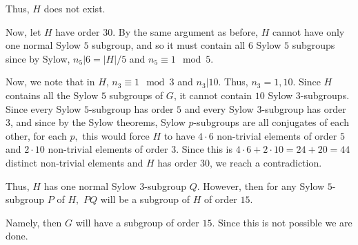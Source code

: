 \documentclass[12pt]{AlgebraQual}
\begin{document}
\begin{solution}
\begin{enumerate}[label=(\alph*)]
    Thus, $H$ does not exist.

     Now, let $H$ have order $30.$ By the same argument as before, $H$ cannot have only one normal Sylow $5$ subgroup, and so it must contain all $6$ Sylow $5$ subgroups since by Sylow, $n_5|6=|H|/5$ and $n_5\equiv 1\mod 5.$

    Now, we note that in $H$, $n_3\equiv 1\mod 3$ and $n_3|10$. Thus, $n_3=1,10.$ Since $H$ contains all the Sylow $5$ subgroups of $G$, it cannot contain $10$ Sylow $3$-subgroups. Since every Sylow $5$-subgroup has order $5$ and every Sylow $3$-subgroup has order $3$, and since by the Sylow theorems, Sylow $p$-subgroups are all conjugates of each other, for each $p,$ this would force $H$ to have $4\cdot 6$ non-trivial elements of order $5$ and $2\cdot 10$ non-trivial elements of order $3$. Since this is $4\cdot 6+2\cdot 10=24+20=44$ distinct non-trivial elements and $H$ has order $30$, we reach a contradiction.

    Thus, $H$ has one normal Sylow $3$-subgroup $Q$. However, then for any Sylow $5$-subgroup $P$ of $H,$ $PQ$ will be a subgroup of $H$ of order $15$.

    Namely, then $G$ will have a subgroup of order $15.$ Since this is not possible we are done.

\begin{comment}
    Therefore, $$|H\cap N_G(P)|=|N_H(P)|=|H|/n_5=30/6=5$$ and so $$|HN_G(P)|=\frac{|H||N_G(P)|}{|H\cap N_G(P)|}=\frac{30\cdot 20}{5}=120.$$

    Namely, $G=HN_G(P)=N_G(P)H$



    However, because $3$ does not divide $N_G(P)$ this implies that $G$ has one normal Sylow $3$-subgroup.

    To see this, we examine $N_G(Q)$ where $Q$ is a Sylow $3$-subgroup of $H$ (and so of $G$). $H\subset N_G(Q)$. If $N_G(Q)=H$ then $N_G(Q)\cap N_G(P)=H\cap N_G(P)=P$ so $P$ normalizes $Q.$

    However, then $PQ=QP$ since for all $p\in P$ and $q\in Q$, we have that $pqp^{-1}=q_0$ some $q_0\in Q$ so $pq=q_0p\in QP$ and similarly for the other inclusion.

    Therefore, $PQ$ is a subgroup and it has order $3\cdot 5=15$. However, we already showed no such subgroups existed.

    If $N_G(Q)$ is strictly greater than $H$, then it has order $60$ or order $120$. If it has order $60$, then it is normal in $G$ because it has index $2.$ However, by Sylow, $$G=N_G(N_G(Q))=N_G(Q)\qquad Q\text{ Sylow subgroups }$$ so this contradicts that $N_G(Q)$ has order $60.$


\end{comment}
\end{enumerate}
\end{solution}
\end{document}
